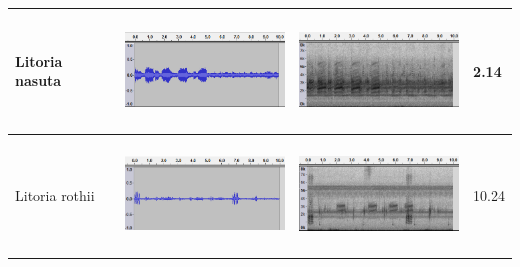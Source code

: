 \begin{table}[htb!]
{\begin{tabular}{llll}
Litoria nasuta              &   \begin{minipage}{.3\textwidth} \includegraphics[width=45mm, height=30mm]{image/nasuta_jcu_wav.png}  \end{minipage}       &  \begin{minipage}{.3\textwidth} \includegraphics[width=45mm, height=30mm]{image/nasuta_jcu_spec.png}  \end{minipage}           & 2.14     \\ \hline
Litoria rothii              &   \begin{minipage}{.3\textwidth} \includegraphics[width=45mm, height=30mm]{image/rothii_jcu_wav.png}  \end{minipage}       &    \begin{minipage}{.3\textwidth} \includegraphics[width=45mm, height=30mm]{image/rothii_jcu_spec.png}  \end{minipage}         & 10.24    \\ \hline

\end{tabular}}
\end{table}

